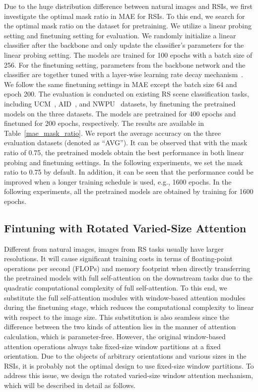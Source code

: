 \documentclass[10pt, journal,twoside]{IEEEtran}
\begin{document}
Due to the huge distribution difference between natural images and RSIs, we first investigate the optimal mask ratio in MAE for RSIs. To this end, we search for the optimal mask ratio on the  dataset for pretraining. We utilize a linear probing setting and finetuning setting for evaluation. We randomly initialize a linear classifier after the backbone and only update the classifier's parameters for the linear probing setting. The models are trained for 100 epochs with a batch size of 256. For the finetuning setting, parameters from the backbone network and the classifier are together tuned with a layer-wise learning rate decay mechanism~\cite{beit,mae}. We follow the same finetuning settings in MAE \cite{mae} except the batch size 64 and epoch 200. The evaluation is conducted on existing RS scene classification tasks, including UCM~\cite{ucm}, AID~\cite{aid}, and NWPU~\cite{asr_review} datasets, by finetuning the pretrained models on the three datasets. The models are pretrained for 400 epochs and finetuned for 200 epochs, respectively. The results are available in Table~\ref{mae_mask_ratio}. We report the average accuracy on the three evaluation datasets (denoted as ``AVG''). It can be observed that with the mask ratio of 0.75, the pretrained models obtain the best performance in both linear probing and finetuning settings. In the following experiments, we set the mask ratio to 0.75 by default. In addition, it can be seen that the performance could be improved when a longer training schedule is used, e.g., 1600 epochs. In the following experiments, all the pretrained models are obtained by training for 1600 epochs.

\subsection{Fintuning with Rotated Varied-Size Attention}
Different from natural images, images from RS tasks usually have larger resolutions. It will cause significant training costs in terms of floating-point operations per second (FLOPs) and memory footprint when directly transferring the pretrained models with full self-attention on the downstream tasks due to the quadratic computational complexity of full self-attention. To this end, we substitute the full self-attention modules with window-based attention modules during the finetuning stage, which reduces the computational complexity to linear with respect to the image size. This substitution is also seamless since the difference between the two kinds of attention lies in the manner of attention calculation, which is parameter-free. However, the original window-based attention operations always take fixed-size window partitions at a fixed orientation. Due to the objects of arbitrary orientations and various sizes in the RSIs, it is probably not the optimal design to use fixed-size window partitions. To address this issue, we design the rotated varied-size window attention mechanism, which will be described in detail as follows.
\end{document}

